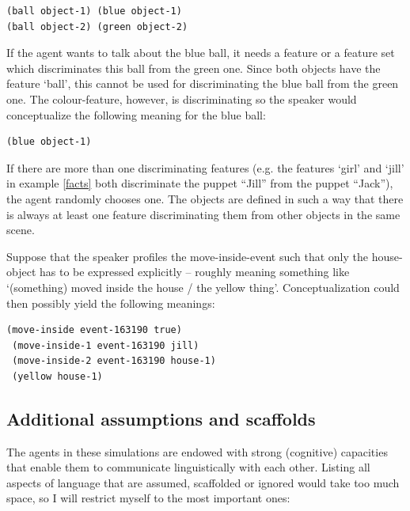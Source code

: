 \ea
\begin{lstlisting}
(ball object-1) (blue object-1)
(ball object-2) (green object-2)
\end{lstlisting}
\z

If the agent wants to talk about the blue ball, it needs a feature or a feature set which discriminates this ball from the green one. Since both objects have the feature `ball', this cannot be used for discriminating the blue ball from the green one. The colour-feature, however, is discriminating so the speaker would conceptualize the following meaning for the blue ball:

\ea
\begin{lstlisting}
(blue object-1)
\end{lstlisting}
\z

If there are more than one discriminating features (e.g. the features `girl' and `jill' in example \ref{facts} both discriminate the puppet ``Jill'' from the puppet ``Jack''), the agent randomly chooses one. The objects are defined in such a way that there is always at least one feature discriminating them from other objects in the same scene.

Suppose that the speaker profiles the move-inside-event such that only the house-object has to be expressed explicitly -- roughly meaning something like `(something) moved inside the house / the yellow thing'. Conceptualization could then possibly yield the following meanings:

\ea
\label{facts3}
\begin{lstlisting} 
(move-inside event-163190 true)
 (move-inside-1 event-163190 jill)
 (move-inside-2 event-163190 house-1)
 (yellow house-1)
\end{lstlisting}
\z

\subsection{Additional assumptions and scaffolds}
\label{s:assumptions}

The agents in these simulations are endowed with strong (cognitive) capacities that enable them to communicate linguistically with each other. Listing all aspects of language that are assumed, scaffolded or ignored would take too much space, so I will restrict myself to the most important ones:

